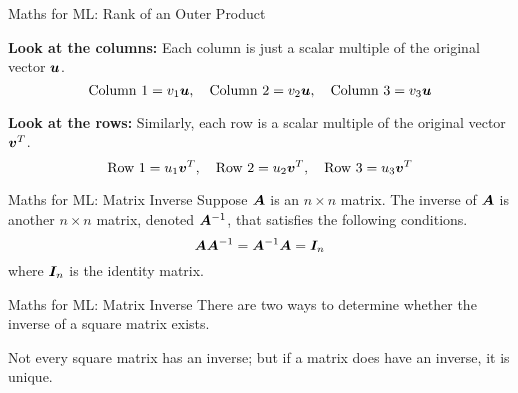 \documentclass{beamer}
\begin{document}
\begin{frame}{Maths for ML: Rank of an Outer Product}
\footnotesize
    \cleanitemize
    {
        \item \textbf{Look at the columns:} Each column is just a scalar multiple of the original vector $\bm{u}$.
        $$
        \text{Column 1} = v_1\bm{u}, \quad \text{Column 2} = v_2\bm{u}, \quad \text{Column 3} = v_3\bm{u}
        $$
        
        \item \textbf{Look at the rows:} Similarly, each row is a scalar multiple of the original vector $\bm{v}^T$.
         $$
        \text{Row 1} = u_1\bm{v}^T, \quad \text{Row 2} = u_2\bm{v}^T, \quad \text{Row 3} = u_3\bm{v}^T
        $$
    }

\end{frame}

\begin{frame}{Maths for ML: Matrix Inverse}
Suppose $\bm{A}$ is an $n \times n$ matrix. The inverse of $\bm{A}$ is another $n \times n$ matrix, denoted $\bm{A}^{-1}$, that satisfies the following conditions.
\[
\bm{A}\bm{A}^{-1}=\bm{A}^{-1} \bm{A}=\bm{I}_n
\]
where $\bm{I}_n$ is the identity matrix.

\end{frame}

\begin{frame}{Maths for ML: Matrix Inverse}
There are two ways to determine whether the inverse of a square matrix exists.

 {Not every square matrix has an inverse; but if a matrix does have an inverse, it is unique.}
\end{frame}
\end{document}
